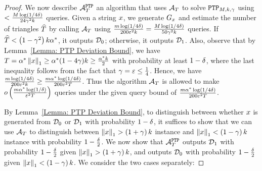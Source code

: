 \begin{proof}



We now describe $\mathcal{A}_{T}^{\texttt{PTP}}$ an algorithm that uses $\mathcal{A}_{T}$ to solve $\texttt{PTP}_{M,k,\gamma}$ using $<\frac{M\log\left({1/4\delta}\right)}{24\gamma^2k}$ queries. Given a string $x$, we generate ${G_{x}}$ and estimate the number of triangles $\widehat{T}$ by calling $\mathcal{A}_{T}$ using $\frac{m\log\left({1/4\delta}\right)}{200\varepsilon^2k} = \frac{M\log(1/4\delta)}{50\gamma^2k}$ queries. If $\widehat{T} < \left({1-\gamma^2}\right)k\alpha^*$, it outputs $\mathcal{D}_0$; otherwise, it outputs $\mathcal{D}_1$. Also, observe that by Lemma~\ref{Lemma: PTP Deviation Bound}, we have  $T = \alpha^*\left\|{x}\right\|_1 \geq \alpha^*(1-4\gamma)k \geq \frac{\alpha^*k}{2}$ with probability at least $1-\delta$, where the last inequality follows from the fact that $\gamma = \varepsilon \leq \frac{1}{4}$. Hence, we have $\frac{m\log\left({1/4\delta}\right)}{200\varepsilon^2k} \geq \frac{m\alpha^*\log\left({1/4\delta}\right)}{200\varepsilon^2T}$. Thus the algorithm $\mathcal{A}_{T}$ is allowed to make $o\left({{\frac{m\alpha^*\log\left({1/\delta}\right)}{\varepsilon^2T}}}\right)$ queries under the given query bound of $\frac{m\alpha^*\log\left({1/4\delta}\right)}{200\varepsilon^2T}$.


By Lemma~\ref{Lemma: PTP Deviation Bound}, to distinguish between whether $x$ is generated from $\mathcal{D}_0$ or $\mathcal{D}_1$ with probability $1 - \delta$, it suffices to show that we can use $\mathcal{A}_{T}$ to distinguish between $\left\|{x}\right\|_1 > \left({1+\gamma}\right)k$ instance and $\left\|{x}\right\|_1 < \left({1-\gamma}\right)k$ instance with probability $1-\frac{\delta}{2}$. We now show that $\mathcal{A}_{T}^{\texttt{PTP}}$ outputs $\mathcal{D}_1$ with probability $1-\frac{\delta}{2}$ given $\left\|{x}\right\|_1 > \left({1+\gamma}\right)k$, and outputs $\mathcal{D}_0$ with probability $1-\frac{\delta}{2}$ given $\left\|{x}\right\|_1 < \left({1-\gamma}\right)k$. We consider the two cases separately: 


\end{proof}
